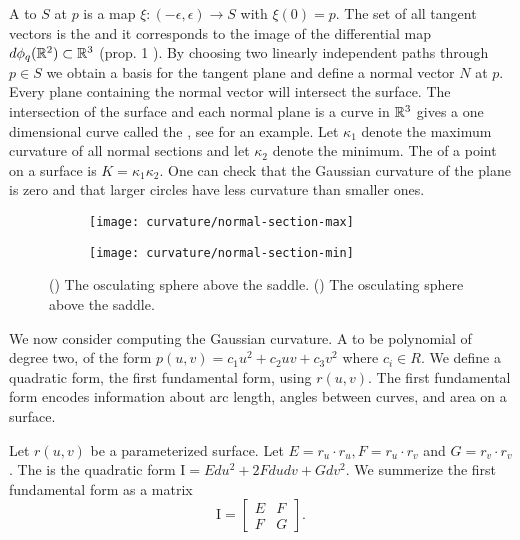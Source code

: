 A  to $S$ at $p$ is a map $\xi:(-\epsilon,\epsilon)\to S$ with $\xi(0)=p$.
The set of all tangent vectors is the  and it corresponds to the image
of the differential map $d\phi_q(\mathbb{R}^2)\subset \mathbb{R}^3$ (prop. 1 \cite{doc76}).
By choosing two linearly independent paths through $p\in S$ we obtain a basis 
for the tangent
plane and define a normal vector $N$ at $p$.
Every plane containing the normal vector will intersect the surface.
The intersection of the surface and each normal plane is a curve in $\mathbb{R}^3$
gives a one dimensional curve called the , see  
for an example.
Let $\kappa_1$ denote the maximum curvature of all normal sections 
and let $\kappa_2$ denote the minimum. 
The  of a point on a surface is
$K=\kappa_1\kappa_2.$
One can check that the Gaussian curvature of the plane is zero and
that larger circles have less curvature than smaller ones.



\begin{figure}[htb]
    \captionsetup[subfigure]{justification=centering}
    \centering
    \begin{subfigure}[b]{0.25\textwidth}
        \texttt{[image: curvature/normal-section-max]}
       \subcaption{}\label{fig:normal-section-max}
    \end{subfigure}
        \hspace{1cm}
        \begin{subfigure}[b]{0.25\textwidth}
        \texttt{[image: curvature/normal-section-min]}
        \subcaption{}\label{fig:normal-section-min}
        \end{subfigure}
    \caption{() The osculating sphere above the saddle.
        () The osculating sphere above the saddle.
    }
    \label{fig:normal-sections}
\end{figure}


We now consider computing the Gaussian curvature.
A  to be polynomial of degree two, of the form $p(u,v)=c_1u^2+c_2uv+c_3v^2$ 
where $c_i\in R$.
We define a quadratic form, the first fundamental form, using $r(u,v)$.
The first fundamental form encodes information about arc length, angles between curves,
and area on a surface.

Let $r(u,v)$ be a parameterized surface.
Let $E=r_u\cdot r_u, F=r_u\cdot r_v$ and  $G=r_v\cdot r_v$.
The 
is the quadratic form $\mathrm{I}=Edu^2+2Fdudv +Gdv^2$.
We summerize the first fundamental form as a matrix $$\mathrm{I}=\begin{bmatrix}
E & F \\
F & G 
\end{bmatrix}.$$

